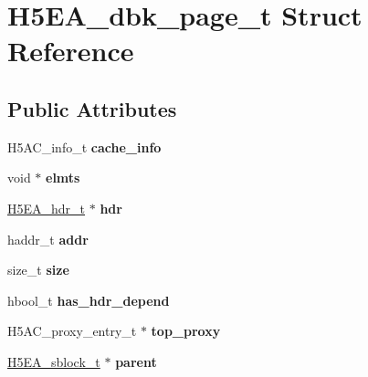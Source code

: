 \hypertarget{struct_h5_e_a__dbk__page__t}{}\section{H5\+E\+A\+\_\+dbk\+\_\+page\+\_\+t Struct Reference}
\label{struct_h5_e_a__dbk__page__t}
\subsection*{Public Attributes}
\begin{DoxyCompactItemize}
\item 
\mbox{\label{struct_h5_e_a__dbk__page__t_a9371641f054e54065c034c6acef28e74}} 
H5\+A\+C\+\_\+info\+\_\+t {\bfseries cache\+\_\+info}
\item 
\mbox{\label{struct_h5_e_a__dbk__page__t_af68e1f381e8ca5071c26adf9c1b527c4}} 
void $\ast$ {\bfseries elmts}
\item 
\mbox{\label{struct_h5_e_a__dbk__page__t_a7e247e4ad21d12493e972c707041eb57}} 
\hyperlink{struct_h5_e_a__hdr__t}{H5\+E\+A\+\_\+hdr\+\_\+t} $\ast$ {\bfseries hdr}
\item 
\mbox{\label{struct_h5_e_a__dbk__page__t_a7ed5f8da508acb8a733633df250e63a2}} 
haddr\+\_\+t {\bfseries addr}
\item 
\mbox{\label{struct_h5_e_a__dbk__page__t_a2a4e5a98ac2d4c847f89d719952d3f9a}} 
size\+\_\+t {\bfseries size}
\item 
\mbox{\label{struct_h5_e_a__dbk__page__t_adbb7e3cd7798e05161fb4ff48825a9c3}} 
hbool\+\_\+t {\bfseries has\+\_\+hdr\+\_\+depend}
\item 
\mbox{\label{struct_h5_e_a__dbk__page__t_a5e2af348adcfbebfcb4c11f3d07eb37a}} 
H5\+A\+C\+\_\+proxy\+\_\+entry\+\_\+t $\ast$ {\bfseries top\+\_\+proxy}
\item 
\mbox{\label{struct_h5_e_a__dbk__page__t_a22246f20f643a5202fc1c6f08005ddc9}} 
\hyperlink{struct_h5_e_a__sblock__t}{H5\+E\+A\+\_\+sblock\+\_\+t} $\ast$ {\bfseries parent}
\end{DoxyCompactItemize}


